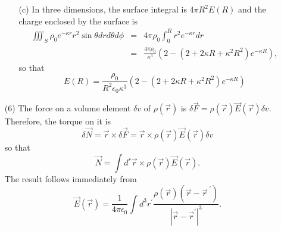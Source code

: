 \documentclass{article}
\newcommand{\op}{\prime}
\newcommand{\ke}{\frac{1}{4\pi\epsilon_0}}
\begin{document}
\begin{enumerate}
\begin{enumerate}
\item[(c)] In three dimensions, the surface integral is $4\pi R^2E(R)$ and the 
charge enclosed by the surface is
\begin{eqnarray*}
\iiint_S \rho_0 e^{-\kappa r}r^2\sin\theta drd\theta d\phi
&=& 4\pi\rho_0 \int_0^R r^2 e^{-\kappa r}dr \\
&=& \frac{4\pi\rho_0}{\kappa^3}\left(2 - (2 + 2\kappa R + \kappa^2R^2)e^{-\kappa R}\right),
\end{eqnarray*}
so that
\[
E(R) = \frac{\rho_0}{R^2\epsilon_0\kappa^3}\left(2 - (2 + 2\kappa R + \kappa^2R^2)e^{-\kappa R}\right)
\]
\end{enumerate}

\item[(6)] The force on a volume element $\delta v$ of $\rho(\vec{r})$ is 
$\delta\vec{F} = \rho(\vec{r})\vec{E}(\vec{r})\delta v$. Therefore, the torque 
on it is
\[
\delta\vec{N} = \vec{r} \times \delta\vec{F} = \vec{r}\times\rho(\vec{r})\vec{E}(\vec{r})\delta v
\]
so that
\[
\vec{N} = \int d^r \vec{r}\times\rho(\vec{r})\vec{E}(\vec{r}).
\]
The result follows immediately from 
\[
\vec{E}(\vec{r}) = \ke\int d^3r^\op \frac{\rho(\vec{r})(\vec{r} - \vec{r}^{\;\op})}{|\vec{r} - \vec{r}^\op|^3}.
\]
\end{enumerate}
\end{document}
